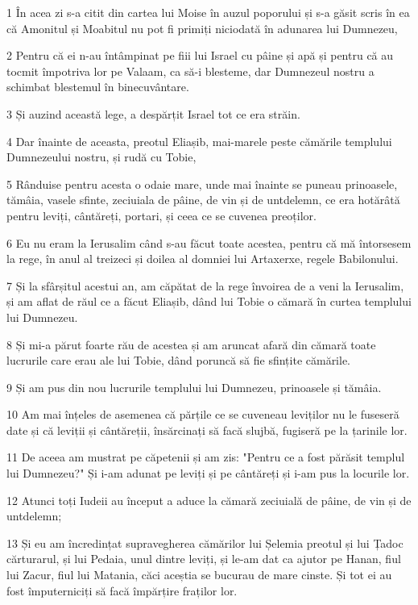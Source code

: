 \par 1 În acea zi s-a citit din cartea lui Moise în auzul poporului și s-a găsit scris în ea că Amonitul și Moabitul nu pot fi primiți niciodată în adunarea lui Dumnezeu,
\par 2 Pentru că ei n-au întâmpinat pe fiii lui Israel cu pâine și apă și pentru că au tocmit împotriva lor pe Valaam, ca să-i blesteme, dar Dumnezeul nostru a schimbat blestemul în binecuvântare.
\par 3 Și auzind această lege, a despărțit Israel tot ce era străin.
\par 4 Dar înainte de aceasta, preotul Eliașib, mai-marele peste cămările templului Dumnezeului nostru, și rudă cu Tobie,
\par 5 Rânduise pentru acesta o odaie mare, unde mai înainte se puneau prinoasele, tămâia, vasele sfinte, zeciuiala de pâine, de vin și de untdelemn, ce era hotărâtă pentru leviți, cântăreți, portari, și ceea ce se cuvenea preoților.
\par 6 Eu nu eram la Ierusalim când s-au făcut toate acestea, pentru că mă întorsesem la rege, în anul al treizeci și doilea al domniei lui Artaxerxe, regele Babilonului.
\par 7 Și la sfârșitul acestui an, am căpătat de la rege învoirea de a veni la Ierusalim, și am aflat de răul ce a făcut Eliașib, dând lui Tobie o cămară în curtea templului lui Dumnezeu.
\par 8 Și mi-a părut foarte rău de acestea și am aruncat afară din cămară toate lucrurile care erau ale lui Tobie, dând poruncă să fie sfințite cămările.
\par 9 Și am pus din nou lucrurile templului lui Dumnezeu, prinoasele și tămâia.
\par 10 Am mai înțeles de asemenea că părțile ce se cuveneau leviților nu le fuseseră date și că leviții și cântăreții, însărcinați să facă slujbă, fugiseră pe la țarinile lor.
\par 11 De aceea am mustrat pe căpetenii și am zis: "Pentru ce a fost părăsit templul lui Dumnezeu?" Și i-am adunat pe leviți și pe cântăreți și i-am pus la locurile lor.
\par 12 Atunci toți Iudeii au început a aduce la cămară zeciuială de pâine, de vin și de untdelemn;
\par 13 Și eu am încredințat supravegherea cămărilor lui Șelemia preotul și lui Țadoc cărturarul, și lui Pedaia, unul dintre leviți, și le-am dat ca ajutor pe Hanan, fiul lui Zacur, fiul lui Matania, căci aceștia se bucurau de mare cinste. Și tot ei au fost împuterniciți să facă împărțire fraților lor.
